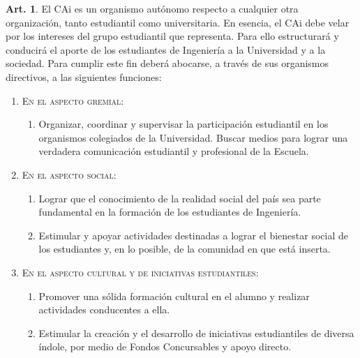 \documentclass[letterpaper,11pt]{article}
\theoremstyle{definition}%
\newtheorem{art}{Art.} %
\begin{document}
\begin{art}\label{finalidadesCAi}
	El CAi es un organismo autónomo respecto a cualquier otra organización, tanto estudiantil como universitaria. En esencia, el CAi debe velar por los intereses del grupo estudiantil que representa. Para ello estructurará y conducirá el aporte de los estudiantes de Ingeniería a la Universidad y a la sociedad. Para cumplir este fin deberá abocarse, a través de sus organismos directivos, a las siguientes funciones:

	\begin{enumerate}

		\item \label{gremial}\textsc{\sc En el aspecto gremial:}
		      \begin{enumerate}
			      \item Organizar, coordinar y supervisar la participación estudiantil en los organismos colegiados de la Universidad. Buscar medios para lograr una verdadera comunicación estudiantil y profesional de la Escuela.
		      \end{enumerate}

		\item \label{social} \textsc{En el aspecto social:}
		      \begin{enumerate}
			      \item Lograr que el conocimiento de la realidad social del país sea parte fundamental en la formación de los estudiantes de Ingeniería.

			      \item \label{bienestar_social} Estimular y apoyar actividades destinadas a lograr el bienestar social de los estudiantes y, en lo posible, de la comunidad en que está inserta.
		      \end{enumerate}

		\item \label{cultural}\textsc{En el aspecto cultural y de iniciativas estudiantiles:}
		      \begin{enumerate}
			      \item Promover una sólida formación cultural en el alumno y realizar actividades conducentes a ella.

			      \item Estimular la creación y el desarrollo de iniciativas estudiantiles de diversa índole, por medio de Fondos Concursables y apoyo directo.
		      \end{enumerate}

	\end{enumerate}
\end{art}
\end{document}
